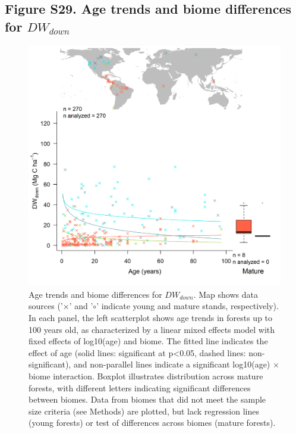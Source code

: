 \documentclass[
]{article}
\begin{document}
\newpage

\hypertarget{figure-s29.-age-trends-and-biome-differences-for-dw_down}{%
\subsection{\texorpdfstring{Figure S29. Age trends and biome differences
for
\(DW_{down}\)}{Figure S29. Age trends and biome differences for DW\_\{down\}}}\label{figure-s29.-age-trends-and-biome-differences-for-dw_down}}

\begin{figure}[H]

{\centering \includegraphics[width=1\linewidth]{tables_figures/age_trends/deadwood_down_with_map} 

}

\caption{Age trends and biome differences for $DW_{down}$. Map shows data sources ('$\times$' and '$\circ$' indicate young and mature stands, respectively). In each panel, the left scatterplot shows age trends in forests up to 100 years old, as characterized by a linear mixed effects model with fixed effects of log10(age) and biome. The fitted line indicates the effect of age (solid lines: significant at p<0.05, dashed lines: non-significant), and non-parallel lines indicate a significant log10(age) $\times$ biome interaction. Boxplot illustrates distribution across mature forests, with different letters indicating significant differences between biomes. Data from biomes that did not meet the sample size criteria (see Methods) are plotted, but lack regression lines (young forests) or test of differences across biomes (mature forests).}\label{fig:unnamed-chunk-32}
\end{figure}
\end{document}
